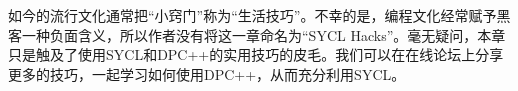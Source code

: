 

如今的流行文化通常把“小窍门”称为“生活技巧”。不幸的是，编程文化经常赋予黑客一种负面含义，所以作者没有将这一章命名为“SYCL Hacks”。毫无疑问，本章只是触及了使用SYCL和DPC++的实用技巧的皮毛。我们可以在在线论坛上分享更多的技巧，一起学习如何使用DPC++，从而充分利用SYCL。\par


\newpage